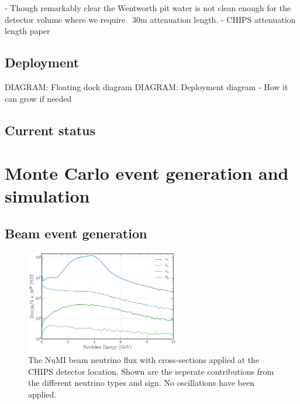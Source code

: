 - Though remarkably clear the Wentworth pit water is not clean enough for the detector volume
where we require ~30m attenuation length.
- CHIPS attenuation length paper~\cite{amat2017}

\subsection{Deployment} %
\label{sec:chips_detector_deployment} %

DIAGRAM: Floating dock diagram
DIAGRAM: Deployment diagram
- How it can grow if needed

\subsection{Current status} %
\label{sec:chips_detector_status} %

\section{Monte Carlo event generation and simulation} %
\label{sec:chips_monte_carlo} %

\subsection{Beam event generation} %
\label{sec:chips_monte_carlo_beam} %

\begin{figure} %
    \includegraphics[width=0.6\textwidth]{diagrams/4-chips/flux.pdf}
    \caption[NuMI neutrino flux at CHIPS.]
    {The NuMI beam neutrino flux with cross-sections applied at the CHIPS detector location. Shown
        are the seperate contributions from the different neutrino types and sign. No oscillations
        have been applied.}
    \label{fig:flux}
\end{figure}

